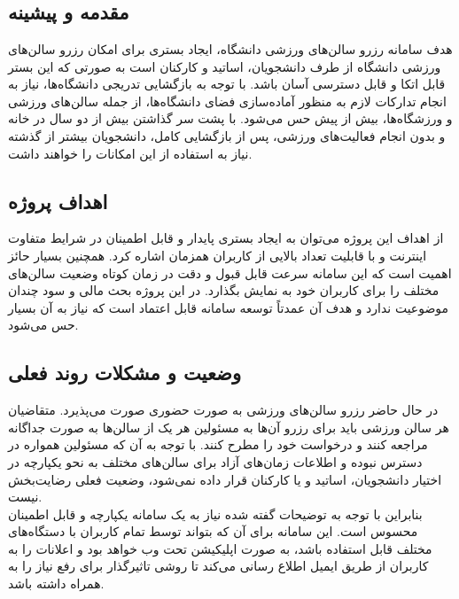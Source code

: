 \section{}

\subsection*{
مقدمه و پیشینه
}

هدف سامانه رزرو سالن‌های ورزشی دانشگاه، ایجاد بستری برای امکان رزرو سالن‌های ورزشی دانشگاه از طرف دانشجویان، اساتید و کارکنان است به صورتی که این بستر قابل اتکا و قابل دسترسی آسان باشد. با توجه به بازگشایی تدریجی دانشگاه‌ها، نیاز به انجام تدارکات لازم به منظور آماده‌سازی فضای دانشگاه‌ها، از جمله سالن‌های ورزشی و ورزشگاه‌ها، بیش از پیش حس می‌شود. با پشت سر گذاشتن بیش از دو سال در خانه و بدون انجام فعالیت‌های ورزشی، پس از بازگشایی کامل، دانشجویان بیشتر از گذشته نیاز به استفاده از این امکانات را خواهند داشت.


\subsection*{
اهداف پروژه
}

از اهداف این پروژه می‌توان به ایجاد بستری پایدار و قابل اطمینان در شرایط متفاوت اینترنت و با قابلیت تعداد بالایی از کاربران همزمان اشاره کرد. همچنین بسیار حائز اهمیت است که این سامانه سرعت قابل قبول و دقت در زمان کوتاه وضعیت سالن‌های مختلف را برای کاربران خود به نمایش بگذارد. در این پروژه بحث مالی و سود چندان موضوعیت ندارد و هدف آن عمدتاً توسعه سامانه قابل اعتماد است که نیاز به آن بسیار حس می‌شود.


\subsection*{
وضعیت و مشکلات روند فعلی
}

در حال حاضر رزرو سالن‌های ورزشی به صورت حضوری صورت می‌پذیرد. متقاضیان هر سالن ورزشی باید برای رزرو آن‌ها به مسئولین هر یک از سالن‌ها به صورت جداگانه مراجعه کنند و درخواست خود را مطرح کنند. با توجه به آن که مسئولین همواره در دسترس نبوده و اطلاعات زمان‌های آزاد برای سالن‌های مختلف به نحو یکپارچه در اختیار دانشجویان، اساتید و یا کارکنان قرار داده نمی‌شود، وضعیت فعلی رضایت‌بخش نیست.\\
بنابراین با توجه به توضیحات گفته شده نیاز به یک سامانه یکپارچه و قابل اطمینان محسوس است. این سامانه برای آن که بتواند توسط تمام کاربران با دستگاه‌های مختلف قابل استفاده باشد، به صورت اپلیکیشن تحت وب خواهد بود و اعلانات را به کاربران از طریق ایمیل اطلاع رسانی می‌کند تا روشی تاثیرگذار برای رفع نیاز را به همراه داشته باشد.


